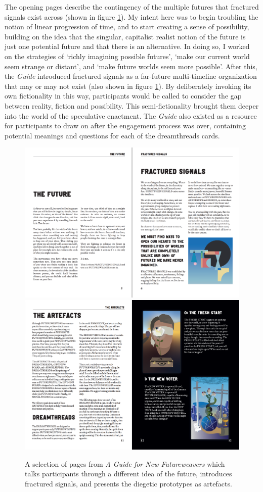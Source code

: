 The opening pages describe the contingency of the multiple futures that fractured signals exist across (shown in figure \ref{fig:guide}).  My intent here was to begin troubling the notion of linear progression of time, and to start creating a sense of possibility, building on the idea that the singular, capitalist realist notion of the future is just one potential future and that there is an alternative. In doing so, I worked on the strategies of ‘richly imagining possible futures’, ‘make our current world seem strange or distant’, and ‘make future worlds seem more possible’.  After this, the \textit{Guide }introduced fractured signals as a far-future multi-timeline organization that may or may not exist (also shown in figure \ref{fig:guide}). By deliberately invoking its own fictionality in this way, participants would be called to consider the gap between reality, fiction and possibility. This semi-fictionality brought them deeper into the world of the speculative enactment. The \textit{Guide} also existed as a resource for participants to draw on after the engagement process was over, containing potential meanings and questions for each of the dreamthreads cards.

\begin{figure}
    \centering
    \includegraphics[width=0.9\linewidth]{Images/8/guide-1.png}
    \includegraphics[width=0.9\linewidth]{Images/8/guide-2.png}
    \caption{A selection of pages from \textit{A Guide for New Futureweavers} which talks participants through a different idea of the future, introduces fractured signals, and presents the diegetic prototypes as artefacts.}
    \label{fig:guide}
\end{figure}



